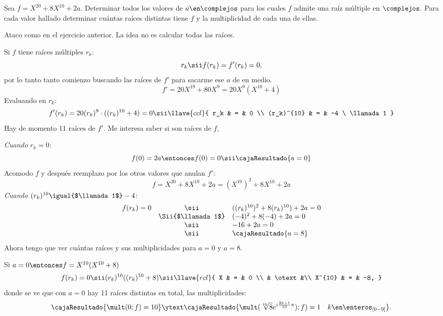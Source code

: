 \begin{enunciado}{\ejercicio}
	Sea $f = X^{20} + 8X^{10} + 2a$. Determinar todos los valores de
	$a \en \complejos$ para los cuales $f$ admite una raíz múltiple en
	$\complejos$. Para cada valor hallado determinar cuántas raíces
	distintas tiene $f$ y la multiplicidad de cada una de ellas.
\end{enunciado}
Ataco como en el ejercicio anterior. La idea no es calcular todas las raíces.

Si $f$ tiene raíces múltiples $r_k$:
$$
	r_k
	\sii
	f(r_k) = f'(r_k) =  0,
$$
por lo tanto  tanto comienzo buscando las raíces de $f'$ para sacarme ese $a$ de en medio.
$$
	f' = 20X^{19} + 80 X^9 =
	20 X^9 (X^{10} + 4)
$$
Evaluando en $r_k$:
$$
	f'(r_k) =
	20 (r_k)^9 \cdot ((r_k)^{10} + 4)=
	0
	\sii
	\llave{ccl}{
		r_k & = & 0 \\
		(r_k)^{10}  & = & -4 \ \llamada1
	}
$$
Hay de momento 11 raíces de $f'$. Me interesa saber si son raíces de $f$,

\textit{Cuando} $r_k = 0$:
$$
	f(0) = 2a
	\entonces
	f(0) = 0
	\sii
	\cajaResultado{
		a = 0
	}
$$
Acomodo $f$ y después reemplazo por los otros valores que anulan $f'$:
$$
	f =
	X^{20} + 8X^{10} + 2a =
	(X^{10})^2 + 8X^{10} + 2a
$$
\textit{Cuando} $(r_k)^{10} \igual{$\llamada1$} -4$:
$$
	\begin{array}{rcl}
		f(r_k) = 0
		 & \sii              &
		((r_k)^{10})^2 + 8(r_k)^{10}) + 2a = 0 \\
		 & \Sii{$\llamada1$} &
		(-4)^2 + 8(-4) + 2a = 0                          \\
		 & \sii              &
		-16 + 2a = 0                                     \\
		 & \sii              &
		\cajaResultado{
			a = 8
		}
	\end{array}
$$
Ahora tengo que ver cuántas raíces y sus multiplicidades para $a = 0$ y $a = 8$.

Si $a = 0 \entonces f = X^{10}(X^{10} + 8)$
$$
	f(r_k) = 0
	\sii
	(r_k)^{10}((r_k)^{10} + 8)
	\sii
	\llave{rcl}{
		X & = & 0 \\
		& \otext &\\
		X^{10} & = & -8,
	}
$$
donde se ve que con $a = 0$ hay 11 raíces distintas en total, las multiplicidades:
$$
	\cajaResultado{\mult(0;f) = 10}
	\ytext
	\cajaResultado{\mult(\sqrt[10]{8}e^{i\frac{2k+1}{10}\pi});f) = 1 \quad k \en \enteros_{[0-9]}}.
$$



